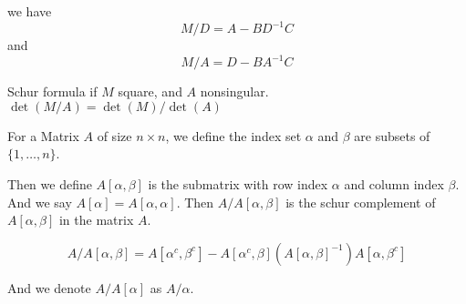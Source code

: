 we have 
$$M/D = A - BD^{-1}C$$
and
$$M/A = D - BA^{-1}C$$

\begin{lemma}
  Schur formula
  if $M$ square, and $A$ nonsingular.
  $\det(M/A) = \det(M)/ \det(A)$
\end{lemma}

For a Matrix $A$ of size $n \times n$,
we define the index set $\alpha$ and $\beta$ are subsets of $\{1,\dots,n\}$.

Then we define $A[\alpha,\beta]$ is the submatrix with row index $\alpha$ and column index $\beta$.
And we say $A[\alpha] = A[\alpha,\alpha]$.
Then $A/A[\alpha,\beta]$ is the schur complement of $A[\alpha,\beta]$ in the matrix $A$.

$$
A/A[\alpha,\beta] = A[\alpha^c,\beta^c] - A[\alpha^c,\beta](A[\alpha,\beta]^{-1})A[\alpha,\beta^c]
$$

And we denote $A/A[\alpha]$ as $A/\alpha$.

\Kchange{}